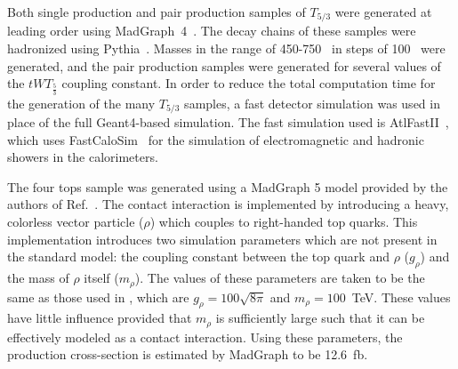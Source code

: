 Both single production and pair production samples of $T_{5/3}$ were generated at leading order using {\sc MadGraph}~4~\cite{Alwall:2007st}.
The decay chains of these samples were hadronized using {\sc Pythia}~\cite{PYTHIA6.4}.
Masses in the range of 450-750~\GeV{} in steps of 100~\GeV{} were generated, and the pair production samples were generated for several values of the $tWT_{\frac{5}{3}}$ coupling constant.
In order to reduce the total computation time for the generation of the many $T_{5/3}$ samples, a fast detector simulation was used in place of the full {\sc Geant4}-based simulation. 
The fast simulation used is {\sc AtlFastII}~\cite{Richter-Was:683751}, which uses {\sc FastCaloSim}~\cite{Yamanaka:1322202} for the simulation of electromagnetic and hadronic showers in the calorimeters.


The four tops sample was generated using a {\sc MadGraph} 5 model provided by the authors of Ref.~\cite{Degrande:2010kt}.
The contact interaction is implemented by introducing a heavy, colorless vector particle ($\rho$) which couples to right-handed top quarks.
This implementation introduces two simulation parameters which are not present in the standard model: the coupling constant between the top quark and $\rho$ ($g_\rho$) and the mass of $\rho$ itself ($m_\rho$).
The values of these parameters are taken to be the same as those used in \cite{Degrande:2010kt}, which are $g_\rho=100\sqrt{8\pi}$ and $m_\rho=100$~TeV.
These values have little influence provided that  $m_\rho$ is sufficiently large such that it can be effectively modeled as a contact interaction.
Using these parameters, the production cross-section is estimated by {\sc MadGraph} to be 12.6~fb.

